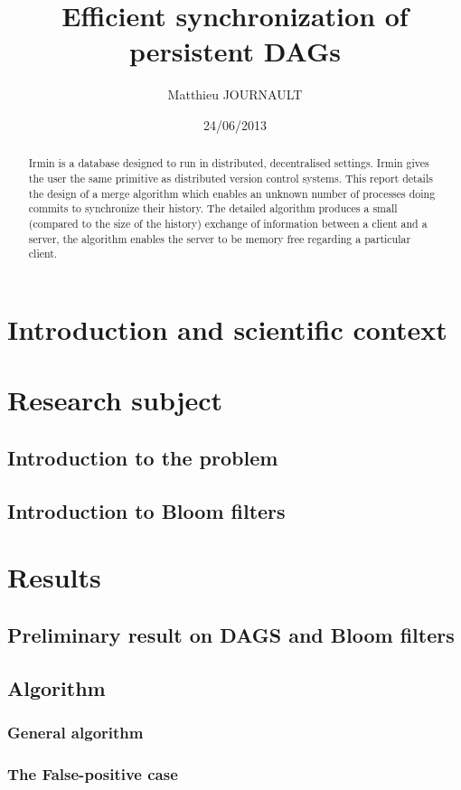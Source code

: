\documentclass[a4paper,10pt]{report}
\title{Efficient synchronization of persistent DAGs}
\author{Matthieu JOURNAULT}
\date{24/06/2013}
\theoremstyle{definition}
\theoremstyle{definition}
\begin{document}
\maketitle
\begin{abstract}
Irmin is a database designed to run in distributed, decentralised settings. Irmin gives the user the same primitive as distributed version control systems. This report details the design of a merge algorithm which enables an unknown number of processes doing commits to synchronize their history. The detailed algorithm produces a small (compared to the size of the history) exchange of information between a client and a server, the algorithm enables the server to be memory free regarding a particular client.
\end{abstract}
\tableofcontents
% 
\chapter{Introduction and scientific context}
\chapter{Research subject}
\section{Introduction to the problem}

\section{Introduction to Bloom filters}

\chapter{Results}
\section{Preliminary result on DAGS and Bloom filters}
\label{sec:prelim}

\section{Algorithm}
\subsection{General algorithm}

\subsection{The False-positive case}
\label{sec:fp}

\end{document}
